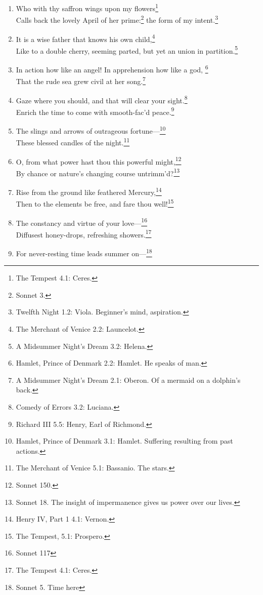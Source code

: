 \documentclass[17pt,twoside]{extarticle}
\begin{document}
\begin{enumerate}
{    Duke Orsino.}\\Is man no more than this? Consider him
  well.\footnote{King Lear 3.4: King Lear.}
\item
  Who with thy saffron wings upon my flowers\footnote{The Tempest 4.1:
    Ceres.}\\Calls back the lovely April of her prime:\footnote{Sonnet
    3.} the form of my intent.\footnote{Twelfth Night 1.2: Viola.
    Beginner's mind, aspiration.}
\item
  It is a wise father that knows his own child,\footnote{The Merchant of
    Venice 2.2: Launcelot.}\\Like to a double cherry, seeming parted,
  but yet an union in partition.\footnote{A Midsummer Night's Dream 3.2:
    Helena.}
\item
  In action how like an angel! In apprehension how like a god,
  \footnote{Hamlet, Prince of Denmark 2.2: Hamlet. He speaks of man.}\\That
  the rude sea grew civil at her song.\footnote{A Midsummer Night's
    Dream 2.1: Oberon. Of a mermaid on a dolphin's back.}
\item
  Gaze where you should, and that will clear your sight.\footnote{Comedy
    of Errors 3.2: Luciana.}\\Enrich the time to come with smooth-fac'd
  peace.\footnote{Richard III 5.5: Henry, Earl of Richmond.}
\item
  The slings and arrows of outrageous fortune---\footnote{Hamlet, Prince
    of Denmark 3.1: Hamlet. Suffering resulting from past actions.}\\These
  blessed candles of the night.\footnote{The Merchant of Venice 5.1:
    Bassanio. The stars.}
\item
  O, from what power hast thou this powerful might,\footnote{Sonnet 150.}\\By
  chance or nature's changing course untrimm'd?\footnote{Sonnet 18. The
    insight of impermanence gives us power over our lives.}
\item
  Rise from the ground like feathered Mercury,\footnote{Henry IV, Part 1
    4.1: Vernon.}\\Then to the elements be free, and fare thou
  well!\footnote{The Tempest, 5.1: Prospero.}
\item
  The constancy and virtue of your love---\footnote{Sonnet 117}\\Diffusest
  honey-drops, refreshing showers.\footnote{The Tempest 4.1: Ceres.}
\item
  For never-resting time leads summer on---\footnote{Sonnet 5. Time here
}
\end{enumerate}
\end{document}
